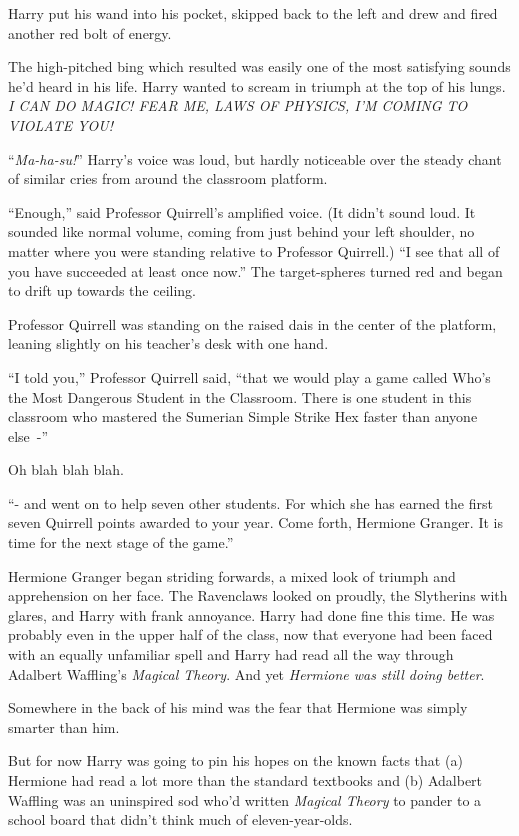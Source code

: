 Harry put his wand into his pocket, skipped back to the left and drew and fired another red bolt of energy.

The high-pitched bing which resulted was easily one of the most satisfying sounds he'd heard in his life. Harry wanted to scream in triumph at the top of his lungs. \emph{I CAN DO MAGIC! FEAR ME, LAWS OF PHYSICS, I'M COMING TO VIOLATE YOU!}

``\emph{Ma-ha-su!}'' Harry's voice was loud, but hardly noticeable over the steady chant of similar cries from around the classroom platform.

``Enough,'' said Professor Quirrell's amplified voice. (It didn't sound loud. It sounded like normal volume, coming from just behind your left shoulder, no matter where you were standing relative to Professor Quirrell.) ``I see that all of you have succeeded at least once now.'' The target-spheres turned red and began to drift up towards the ceiling.

Professor Quirrell was standing on the raised dais in the center of the platform, leaning slightly on his teacher's desk with one hand.

``I told you,'' Professor Quirrell said, ``that we would play a game called Who's the Most Dangerous Student in the Classroom. There is one student in this classroom who mastered the Sumerian Simple Strike Hex faster than anyone else~-''

Oh blah blah blah.

``- and went on to help seven other students. For which she has earned the first seven Quirrell points awarded to your year. Come forth, Hermione Granger. It is time for the next stage of the game.''

Hermione Granger began striding forwards, a mixed look of triumph and apprehension on her face. The Ravenclaws looked on proudly, the Slytherins with glares, and Harry with frank annoyance. Harry had done fine this time. He was probably even in the upper half of the class, now that everyone had been faced with an equally unfamiliar spell and Harry had read all the way through Adalbert Waffling's \emph{Magical Theory}. And yet \emph{Hermione was still doing better}.

Somewhere in the back of his mind was the fear that Hermione was simply smarter than him.

But for now Harry was going to pin his hopes on the known facts that (a) Hermione had read a lot more than the standard textbooks and (b) Adalbert Waffling was an uninspired sod who'd written \emph{Magical Theory} to pander to a school board that didn't think much of eleven-year-olds.

